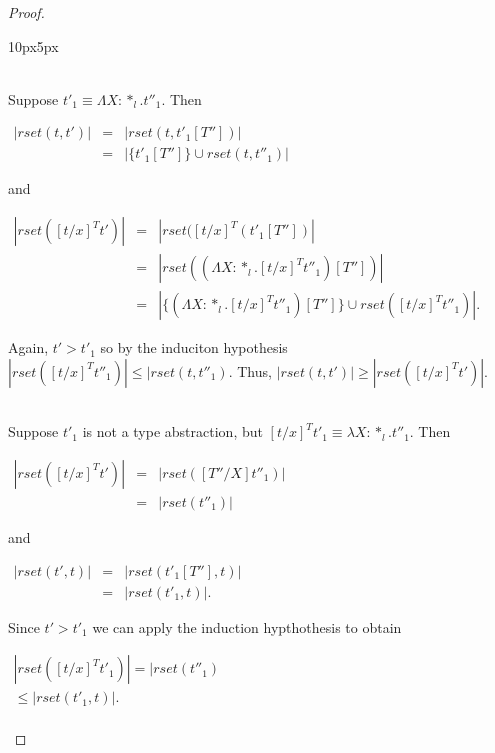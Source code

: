 \begin{proof}
\begin{changemargin}{10px}{5px}
\begin{itemize}
  \ \\
  Suppose $t'_1 \equiv \Lambda X:*_l.t''_1$.  Then 
  \begin{center}
    \begin{math}
      \begin{array}{lll}
        |rset(t,t')| & = & |rset(t, t'_1[T''])|\\
        & = & |\{t'_1[T'']\} \cup rset(t,t''_1)|
      \end{array}
    \end{math}
  \end{center}
  and
  \begin{center}
    \begin{math}
      \begin{array}{lll}
        |rset([t/x]^T t')| & = & |rset([t/x]^T(t'_1[T''])|\\
        & = & |rset((\Lambda X:*_l.[t/x]^T t''_1)[T''])|\\
        & = & |\{(\Lambda X:*_l.[t/x]^T t''_1)[T'']\} \cup rset([t/x]^T t''_1)|.
      \end{array}
    \end{math}
  \end{center}
  Again, $t' > t'_1$ so by the induciton hypothesis $|rset([t/x]^T t''_1)| \leq |rset(t,t''_1)$.  Thus,
  $|rset(t,t')| \geq |rset([t/x]^T t')|$.
  
  \ \\
  Suppose $t'_1$ is not a type abstraction, but $[t/x]^T t'_1 \equiv \lambda X:*_l.t''_1$.  Then
  \begin{center}
    \begin{math}
      \begin{array}{lll}
        |rset([t/x]^T t')| & = & |rset([T''/X]t''_1)|\\
        & = & |rset(t''_1)|
      \end{array}
    \end{math}
  \end{center}
  and
  \begin{center}
    \begin{math}
      \begin{array}{lll}
        |rset(t',t)| & = & |rset(t'_1[T''], t)|\\
        & = & |rset(t'_1,t)|.
      \end{array}
    \end{math}
  \end{center}
  Since $t' > t'_1$ we can apply the induction hypthothesis to obtain
  \begin{center}
    \begin{math}
      \begin{array}{lll}
        |rset([t/x]^T t'_1)| = |rset(t''_1)\\ 
        \leq |rset(t'_1,t)|.\\
        

\end{array}
\end{math}
\end{center}
\end{itemize}
\end{changemargin}
\end{proof}
